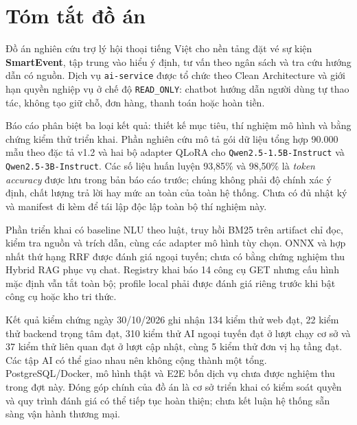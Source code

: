 \chapter*{Tóm tắt đồ án}
{}

Đồ án nghiên cứu trợ lý hội thoại tiếng Việt cho nền tảng đặt vé sự kiện \textbf{SmartEvent}, tập trung vào hiểu ý định, tư vấn theo ngân sách và tra cứu hướng dẫn có nguồn. Dịch vụ \texttt{ai-service} được tổ chức theo Clean Architecture và giới hạn quyền nghiệp vụ ở chế độ \texttt{READ\_ONLY}: chatbot hướng dẫn người dùng tự thao tác, không tạo giữ chỗ, đơn hàng, thanh toán hoặc hoàn tiền.

Báo cáo phân biệt ba loại kết quả: thiết kế mục tiêu, thí nghiệm mô hình và bằng chứng kiểm thử triển khai. Phần nghiên cứu mô tả gói dữ liệu tổng hợp 90.000 mẫu theo đặc tả v1.2 và hai bộ adapter QLoRA cho \texttt{Qwen2.5-1.5B-Instruct} và \texttt{Qwen2.5-3B-Instruct}. Các số liệu huấn luyện 93,85\% và 98,50\% là \textit{token accuracy} được lưu trong bản báo cáo trước; chúng không phải độ chính xác ý định, chất lượng trả lời hay mức an toàn của toàn hệ thống. Chưa có đủ nhật ký và manifest đi kèm để tái lập độc lập toàn bộ thí nghiệm này.

Phần triển khai có baseline NLU theo luật, truy hồi BM25 trên artifact chỉ đọc, kiểm tra nguồn và trích dẫn, cùng các adapter mô hình tùy chọn. ONNX và hợp nhất thứ hạng RRF được đánh giá ngoại tuyến; chưa có bằng chứng nghiệm thu Hybrid RAG phục vụ chat. Registry khai báo 14 công cụ GET nhưng cấu hình mặc định vẫn tắt toàn bộ; profile local phải được đánh giá riêng trước khi bật công cụ hoặc kho tri thức.

Kết quả kiểm chứng ngày 30/10/2026 ghi nhận 134 kiểm thử web đạt, 22 kiểm thử backend trọng tâm đạt, 310 kiểm thử AI ngoại tuyến đạt ở lượt chạy cơ sở và 37 kiểm thử liên quan đạt ở lượt cập nhật, cùng 5 kiểm thử đơn vị hạ tầng đạt. Các tập AI có thể giao nhau nên không cộng thành một tổng. PostgreSQL/Docker, mô hình thật và E2E bốn dịch vụ chưa được nghiệm thu trong đợt này. Đóng góp chính của đồ án là cơ sở triển khai có kiểm soát quyền và quy trình đánh giá có thể tiếp tục hoàn thiện; chưa kết luận hệ thống sẵn sàng vận hành thương mại.
